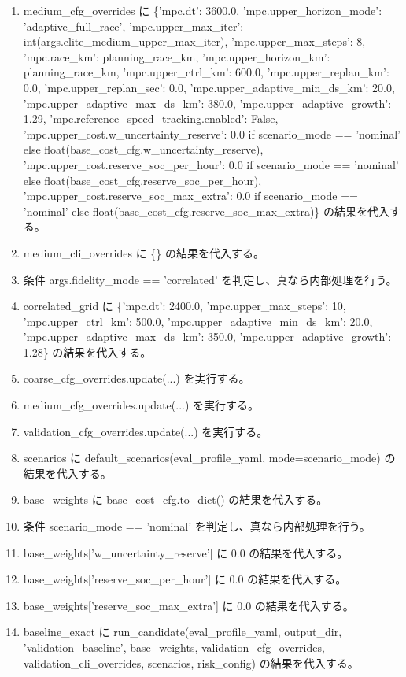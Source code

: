 \documentclass[a4paper,11pt]{article}
\begin{document}
\begin{enumerate}[leftmargin=1.8em]
\item medium\_cfg\_overrides に \{'mpc.dt': 3600.0, 'mpc.upper\_horizon\_mode': 'adaptive\_full\_race', 'mpc.upper\_max\_iter': int(args.elite\_medium\_upper\_max\_iter), 'mpc.upper\_max\_steps': 8, 'mpc.race\_km': planning\_race\_km, 'mpc.upper\_horizon\_km': planning\_race\_km, 'mpc.upper\_ctrl\_km': 600.0, 'mpc.upper\_replan\_km': 0.0, 'mpc.upper\_replan\_sec': 0.0, 'mpc.upper\_adaptive\_min\_ds\_km': 20.0, 'mpc.upper\_adaptive\_max\_ds\_km': 380.0, 'mpc.upper\_adaptive\_growth': 1.29, 'mpc.reference\_speed\_tracking.enabled': False, 'mpc.upper\_cost.w\_uncertainty\_reserve': 0.0 if scenario\_mode == 'nominal' else float(base\_cost\_cfg.w\_uncertainty\_reserve), 'mpc.upper\_cost.reserve\_soc\_per\_hour': 0.0 if scenario\_mode == 'nominal' else float(base\_cost\_cfg.reserve\_soc\_per\_hour), 'mpc.upper\_cost.reserve\_soc\_max\_extra': 0.0 if scenario\_mode == 'nominal' else float(base\_cost\_cfg.reserve\_soc\_max\_extra)\} の結果を代入する。
\item medium\_cli\_overrides に \{\} の結果を代入する。
\item 条件 args.fidelity\_mode == 'correlated' を判定し、真なら内部処理を行う。
\item   correlated\_grid に \{'mpc.dt': 2400.0, 'mpc.upper\_max\_steps': 10, 'mpc.upper\_ctrl\_km': 500.0, 'mpc.upper\_adaptive\_min\_ds\_km': 20.0, 'mpc.upper\_adaptive\_max\_ds\_km': 350.0, 'mpc.upper\_adaptive\_growth': 1.28\} の結果を代入する。
\item   coarse\_cfg\_overrides.update(...) を実行する。
\item   medium\_cfg\_overrides.update(...) を実行する。
\item   validation\_cfg\_overrides.update(...) を実行する。
\item scenarios に default\_scenarios(eval\_profile\_yaml, mode=scenario\_mode) の結果を代入する。
\item base\_weights に base\_cost\_cfg.to\_dict() の結果を代入する。
\item 条件 scenario\_mode == 'nominal' を判定し、真なら内部処理を行う。
\item   base\_weights['w\_uncertainty\_reserve'] に 0.0 の結果を代入する。
\item   base\_weights['reserve\_soc\_per\_hour'] に 0.0 の結果を代入する。
\item   base\_weights['reserve\_soc\_max\_extra'] に 0.0 の結果を代入する。
\item baseline\_exact に run\_candidate(eval\_profile\_yaml, output\_dir, 'validation\_baseline', base\_weights, validation\_cfg\_overrides, validation\_cli\_overrides, scenarios, risk\_config) の結果を代入する。

\end{enumerate}
\end{document}
